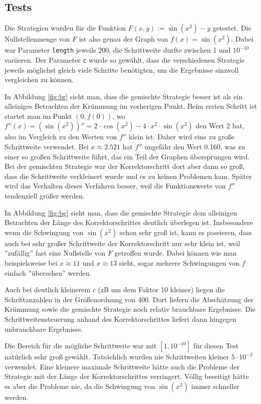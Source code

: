 \documentclass[a4paper,11pt,bibliography=totoc,listof=totoc,headinclude=true,cleardoublepage=empty,oneside]{scrartcl}
\begin{document}
\subsection{Tests}
Die Strategien wurden für die Funktion $F(x,y) := \sin(x^2)-y$ getestet. Die Nullstellenmenge von $F$ ist also genau der Graph von $f(x)=\sin(x^2)$. Dabei war Parameter \verb|length| jeweils 200, die Schrittweite durfte zwischen 1 und $10^{-10}$ variieren. Der Parameter \verb|c| wurde so gewählt, dass die verschiedenen Strategie jeweils möglichst gleich viele Schritte benötigten, um die Ergebnisse sinnvoll vergleichen zu können.

In Abbildung \ref{fig:br} sieht man, dass die gemischte Strategie besser ist als ein alleiniges Betrachten der Krümmung im vorherigen Punkt. Beim ersten Schritt ist startet man im Punkt $(0,f(0))$, wo $f''(x) = (\sin(x^2))''= 2\cdot \cos(x^2) - 4\cdot x^2 \cdot \sin(x^2)$ den Wert 2 hat, also im Vergleich zu den Werten von $f''$ klein ist. Daher wird eine zu große Schrittweite verwendet. Bei $x\approx2.521$ hat $f''$ ungefähr den Wert 0.160, was zu einer so großen Schrittweite führt, das ein Teil der Graphen übersprungen wird. Bei der gemischten Strategie war der Korrektorschritt dort aber dann so groß, dass die Schrittweite verkleinert wurde und es zu keinen Problemen kam. Später wird das Verhalten dieses Verfahren besser, weil die Funktionswerte von $f''$ tendenziell größer werden.

In Abbildung \ref{fig:bg} sieht man, dass die gemischte Strategie dem alleinigen Betrachten der Länge des Korrektorschrittes deutlich überlegen ist. Insbesondere wenn die Schwingung von $\sin(x^2)$ schon sehr groß ist, kann es passieren, dass auch bei sehr großer Schrittweite der Korrektorschritt nur sehr klein ist, weil ''zufällig'' fast eine Nullstelle von $F$ getroffen wurde. Dabei können wie man beispielsweise bei $x\approx11$ und $x\approx13$ sieht, sogar mehrere Schwingungen von $f$ einfach ''übersehen'' werden.

Auch bei deutlich kleinerem $c$ (zB um dem Faktor 10 kleiner) liegen die Schrittanzahlen in der Größenordnung von 400. Dort liefern die Abschätzung der Krümmung sowie die gemischte Strategie noch relativ brauchbare Ergebnisse. Die Schrittweitensteuerung anhand des Korrektorschrittes liefert dann hingegen unbrauchbare Ergebnisse.

Die Bereich für die mögliche Schrittweite war mit $[1,10^{-10}]$ für diesen Test natürlich sehr groß gewählt. Tatsächlich wurden nie Schrittweiten kleiner $5\cdot 10^{-3}$ verwendet. Eine kleinere maximale Schrittweite hätte auch die Probleme der Strategie mit der Länge der Korrektorschrittes verringert. Völlig beseitigt hätte es aber die Probleme nie, da die Schwingung von $\sin(x^2)$ immer schneller werden.
\end{document}
